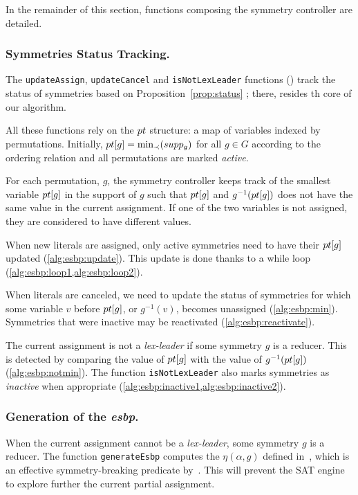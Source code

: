  \medskip\noindent In the remainder of this section, functions
 composing the symmetry controller are detailed.
 
 \subsubsection{Symmetries Status Tracking.} The \texttt{updateAssign},
 \texttt{updateCancel} and \texttt{isNot\-LexLeader} functions () track the status of symmetries based on
 Proposition~\ref{prop:status} ; there, resides th  core of our algorithm.
 
 All these functions rely on the $pt$ structure: a map of variables indexed
 by permutations. Initially, $pt[g] = \min_{\prec}(supp_g)$ for all $g \in G$ according to the ordering relation and all
 permutations are marked \textit{active}.
 
 For each permutation, $g$, the symmetry controller keeps track of the smallest
 variable $pt[g]$ in the support of $g$ such that $pt[g]$ and
 $g^{-1}(pt[g])$ does not have the same value in the current assignment. If
 one of the two variables is not assigned, they are considered  to have different values.
 
 When new literals are assigned, only active symmetries need to have their
 $pt[g]$ updated (\cref{alg:esbp:update}). This update is done thanks to a while
 loop (\cref{alg:esbp:loop1,alg:esbp:loop2}).
 
 When literals are canceled, we need to update the status of symmetries for
 which some variable $v$ before $pt[g]$, or $g^{-1}(v)$, becomes unassigned
 (\cref{alg:esbp:min}). Symmetries that were inactive may be reactivated (\cref{alg:esbp:reactivate}).
 
 The current assignment is not a \textit{lex-leader} if some symmetry $g$ is a
 reducer. This is detected by comparing the value of $pt[g]$ with the value
 of $g^{-1}(pt[g])$ (\cref{alg:esbp:notmin}). The function \texttt{isNotLexLeader} also
 marks symmetries as \emph{inactive} when appropriate (\cref{alg:esbp:inactive1,alg:esbp:inactive2}).
 
 \subsubsection{Generation of the \emph{esbp}.} When the current assignment
 cannot be a \textit{lex-leader}, some symmetry $g$ is a reducer. The function
 \texttt{generateEsbp} computes the $\eta(\alpha, g)$ defined in~,
 which is an effective symmetry-breaking predicate by~. This will
 prevent the SAT engine to explore further the current partial assignment.
 
